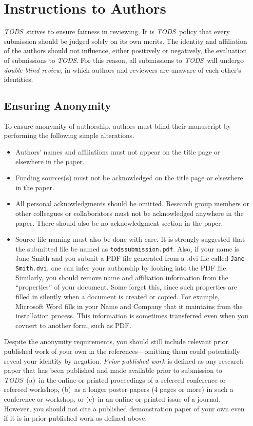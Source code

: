 \documentclass[acmtods,acmnow]{acmtrans2m}
\newcommand{\tods}{{\em TODS\/}}
\begin{document}
\appendix
\section{Instructions to Authors}\label{app:authors}

\tods\ strives to ensure fairness in reviewing. It is
\tods\ policy that every submission should be judged solely on its own
merits. The identity and affiliation of the authors should not influence,
either positively or negatively, the evaluation of submissions to \tods.
For this reason, all submissions to \tods\ will undergo {\em double-blind
review}, in which authors and reviewers are unaware of each other's
identities.

\subsection{Ensuring Anonymity}
To ensure anonymity of authorship, authors must blind their manuscript by
performing the following simple alterations.
\begin{itemize}
\item  Authors' names and affiliations must not appear on the title page or
elsewhere in the paper. 
\item Funding sources(s) must not be acknowledged on the title page or
elsewhere in the paper. 
\item All personal acknowledgments should be omitted. Research group members or other
colleagues or collaborators must not be acknowledged anywhere in the
paper. There should also be no acknowledgment section in the paper. 
\item Source file naming must also be done with care. It is strongly
suggested that the submitted file be named as {\tt todssubmission.pdf}. Also,
if your 
name is Jane Smith and you submit a PDF file generated from a .dvi file
called {\tt Jane-Smith.dvi}, one can infer your authorship by looking into the
PDF file. Similarly, you should remove name and affiliation information from
the ``properties'' of your document.  Some forget this, since such properties
are filled in silently when a document is created or copied.
For example, Microsoft Word fills in your Name and Company that it
maintains from the installation process.  This information
is sometimes transferred even when you covnert to another
form, such as PDF.
\end{itemize}

Despite the anonymity requirements, you should still include relevant prior
published work of your own in the references---omitting them could
potentially reveal your identity by negation. {\em Prior published work} is
defined as any research paper that has been published and made available
prior to submission to \tods\ (a)~in the online or printed proceedings of a
refereed conference or refereed workshop, (b)~as a longer poster papers (4
pages or more) in such a conference or workshop, or (c)~in an online or
printed issue of a journal.  However, you should not cite a published
demonstration paper of your own even if it is in prior published work as
defined above.
\end{document}

